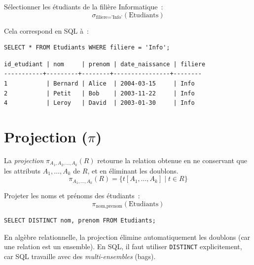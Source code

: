 \begin{exemple}
S\'electionner les \'etudiants de la fili\`ere Informatique~:
\[
\sigma_{\text{filiere} = \text{'Info'}}(\text{Etudiants})
\]

Cela correspond en SQL \`a~:
\begin{codeblock}[title=\textbf{\'Equivalent SQL de la s\'election}]
\begin{verbatim}
SELECT * FROM Etudiants WHERE filiere = 'Info';
\end{verbatim}
\end{codeblock}

\begin{codeoutput}
\begin{verbatim}
id_etudiant | nom     | prenom | date_naissance | filiere
-----------+---------+--------+----------------+--------
1           | Bernard | Alice  | 2004-03-15     | Info
2           | Petit   | Bob    | 2003-11-22     | Info
4           | Leroy   | David  | 2003-01-30     | Info
\end{verbatim}
\end{codeoutput}
\end{exemple}

\section{Projection ($\pi$)}

\begin{definition}[Projection]
La \emph{projection} $\pi_{A_1, A_2, \ldots, A_k}(R)$ retourne la relation
obtenue en ne conservant que les attributs $A_1, \ldots, A_k$ de $R$,
et en \'eliminant les doublons.
\[
\pi_{A_1, \ldots, A_k}(R) = \{ t[A_1, \ldots, A_k] \mid t \in R \}
\]
\end{definition}

\begin{exemple}
Projeter les noms et pr\'enoms des \'etudiants~:
\[
\pi_{\text{nom}, \text{prenom}}(\text{Etudiants})
\]

\begin{codeblock}[title=\textbf{\'Equivalent SQL de la projection}]
\begin{verbatim}
SELECT DISTINCT nom, prenom FROM Etudiants;
\end{verbatim}
\end{codeblock}
\end{exemple}

\begin{attention}[title=\textbf{Projection et doublons}]
En alg\`ebre relationnelle, la projection \'elimine automatiquement les doublons
(car une relation est un ensemble). En SQL, il faut utiliser \texttt{DISTINCT}
explicitement, car SQL travaille avec des \emph{multi-ensembles} (bags).
\end{attention}

